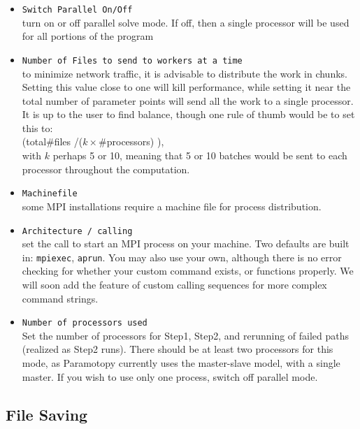 \begin{itemize}
	\item \texttt{Switch Parallel On/Off}  \\turn on or off parallel solve mode.  If off, then a single processor will be used for all portions of the program
	
	\item \texttt{Number of Files to send to workers at a time}\\ to minimize network traffic, it is advisable to distribute the work in chunks.  Setting this value close to one will kill performance, while setting it near the total number of parameter points will send all the work to a single processor.  It is up to the user to find balance, though one rule of thumb would be to set this to:   \\ \hspace{2in} (total\#files /($k \times $\#processors) ), \\with $k$ perhaps 5 or 10, meaning that 5 or 10 batches would be sent to each processor throughout the computation.
	
	\item \texttt{Machinefile} \\ some MPI installations require a machine file for process distribution.
	
	\item \texttt{Architecture / calling} \\ set the call to start an MPI process on your machine.  Two defaults are built in: \texttt{mpiexec}, \texttt{aprun}.  You may also use your own, although there is no error checking for whether your custom command exists, or functions properly.  We will soon add the feature of custom calling sequences for more complex command strings.
	
	\item \texttt{Number of processors used} \\ Set the number of processors for Step1, Step2, and rerunning of failed paths (realized as Step2 runs).  There should be at least two processors for this mode, as Paramotopy currently uses the master-slave model, with a single master.  If you wish to use only one process, switch off parallel mode.
	


\end{itemize}


\subsection{File Saving}


